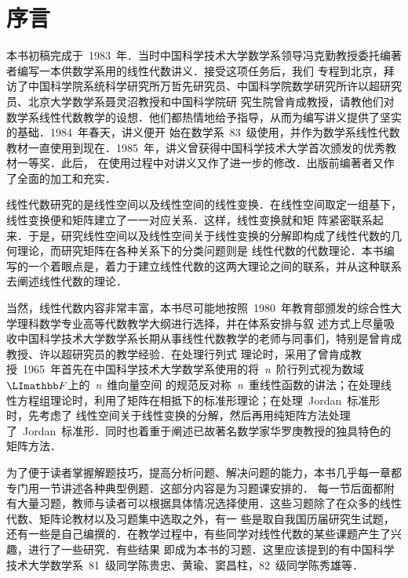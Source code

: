 

\chapter{序\hspace{\ccwd}言}

\begin{fzliukai}
\TeXGyreBonum\boldmath
\setlength\parskip{\baselineskip-\ccwd}
本书初稿完成于~1983~年．当时中国科学技术大学数学系领导冯克勤教授委托编著者编写一本供数学系用的线性代数讲义．接受这项任务后，我们
专程到北京，拜访了中国科学院系统科学研究所万哲先研究员、中国科学院数学研究所许以超研究员、北京大学数学系聂灵沼教授和中国科学院研
究生院曾肯成教授，请教他们对数学系线性代数教学的设想．他们都热情地给予指导，从而为编写讲义提供了坚实的基础．1984~年春天，讲义便开
始在数学系~83~级使用，并作为数学系线性代数教材一直使用到现在．1985~年，讲义曾获得中国科学技术大学首次颁发的优秀教材一等奖．此后，
在使用过程中对讲义又作了进一步的修改．出版前编著者又作了全面的加工和充实．

线性代数研究的是线性空间以及线性空间的线性变换．在线性空间取定一组基下，线性变换便和矩阵建立了一一对应关系．这样，线性变换就和矩
阵紧密联系起来．于是，研究线性空间以及线性空间关于线性变换的分解即构成了线性代数的几何理论，而研究矩阵在各种关系下的分类问题则是
线性代数的代数理论．本书编写的一个着眼点是，着力于建立线性代数的这两大理论之间的联系，并从这种联系去阐述线性代数的理论．

当然，线性代数内容非常丰富，本书尽可能地按照~1980~年教育部颁发的综合性大学理科数学专业高等代数教学大纲进行选择，并在体系安排与叙
述方式上尽量吸收中国科学技术大学数学系长期从事线性代数教学的老师与同事们，特别是曾肯成教授、许以超研究员的教学经验．在处理行列式
理论时，采用了曾肯成教授~1965~年首先在中国科学技术大学数学系使用的将~\textit{n}~阶行列式视为数域~$\mF$上的~\textit{n}~维向量空间
的规范反对称~\textit{n}~重线性函数的讲法；在处理线性方程组理论时，利用了矩阵在相抵下的标准形理论；在处理~Jordan~标准形时，先考虑了
线性空间关于线性变换的分解，然后再用纯矩阵方法处理了~Jordan~标准形．同时也着重于阐述已故著名数学家华罗庚教授的独具特色的矩阵方法．

为了便于读者掌握解题技巧，提高分析问题、解决问题的能力，本书几乎每一章都专门用一节讲述各种典型例题．这部分内容是为习题课安排的．
每一节后面都附有大量习题，教师与读者可以根据具体情况选择使用．这些习题除了在众多的线性代数、矩阵论教材以及习题集中选取之外，有一
些是取自我国历届研究生试题，还有一些是自己编撰的．在教学过程中，有些同学对线性代数的某些课题产生了兴趣，进行了一些研究．有些结果
即成为本书的习题．这里应该提到的有中国科学技术大学数学系~81~级同学陈贵忠、黄瑜、窦昌柱，82~级同学陈秀雄等．


\end{fzliukai}
